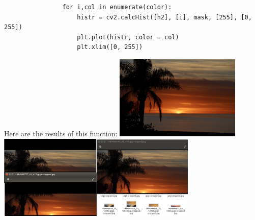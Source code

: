 \documentclass[onecolumn, draftclsnofoot,10pt, compsoc]{IEEEtran}
\begin{document}
\begin{singlespace}
\begin{lstlisting}
				for i,col in enumerate(color):
					histr = cv2.calcHist([h2], [i], mask, [255], [0, 255])
					plt.plot(histr, color = col)
					plt.xlim([0, 255])
			\end{lstlisting}	
			Here are the results of this function:
			\includegraphics[height=4cm,natwidth=640,natheight=426]{images/horizon_uncropped.jpg}
			\includegraphics[height=4cm,natwidth=1281,natheight=537]{images/horizon_cropped.png}
			
\end{singlespace}
\end{document}
